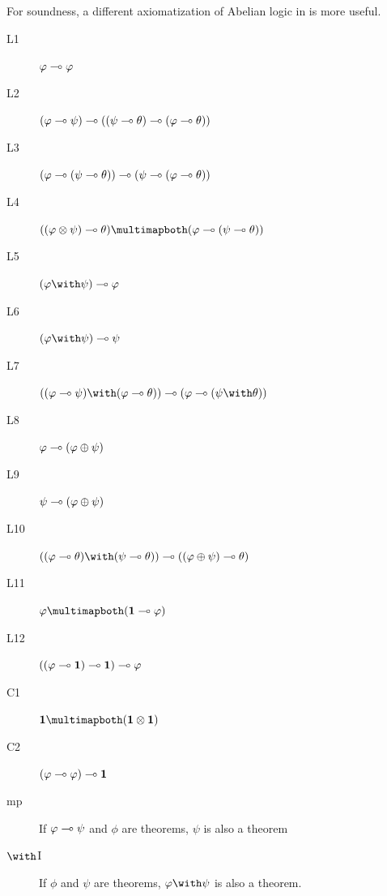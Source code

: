 For soundness, a different axiomatization of Abelian logic in
\citep{metcalfe2006} is more useful.
\begin{description}
 \item[L1] $\varphi\multimap\varphi$
 \item[L2]
      $(\varphi\multimap\psi)\multimap((\psi\multimap\theta)\multimap(\varphi\multimap\theta))$
 \item[L3]
      $(\varphi\multimap(\psi\multimap\theta))\multimap(\psi\multimap(\varphi\multimap\theta))$
 \item[L4]
      $((\phi\otimes\psi)\limp\theta)\multimapboth
      (\phi\limp(\psi\limp\theta))$
 \item[L5]
      $(\phi\with\psi)\limp\phi$
 \item[L6]
      $(\phi\with\psi)\limp\psi$
 \item[L7]
      $((\phi\limp\psi)\with(\phi\limp\theta))\limp
      (\phi\limp(\psi\with\theta))$
 \item[L8]
      $\varphi\multimap(\varphi\oplus\psi)$
 \item[L9]
      $\psi\multimap(\varphi\oplus\psi)$
 \item[L10]
      $((\phi\limp\theta)\with(\psi\limp\theta))\limp((\phi\oplus\psi)\limp\theta)$
 \item[L11]
      $\phi\multimapboth(\one\limp\phi)$
 \item[L12]
      $((\varphi\multimap\mathbf{1})\multimap\mathbf{1})\multimap\varphi$
 \item[C1] $\one\multimapboth (\one\otimes\one)$
 \item[C2] $(\varphi\multimap\varphi)\multimap\mathbf{1}$
 \item[mp]
      If $\varphi\multimap\psi$ and $\phi$ are theorems, $\psi$ is also a
      theorem
 \item[$\with$I] If $\phi$ and $\psi$ are theorems, $\phi\with\psi$ is
      also a theorem.
\end{description}


